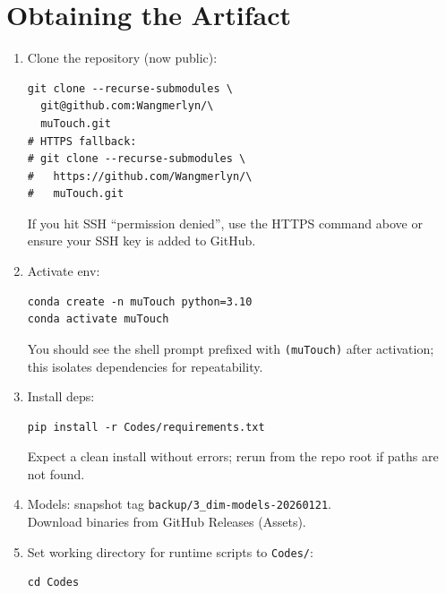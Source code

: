 \documentclass[conference]{IEEEtran}
\begin{document}
\section{Obtaining the Artifact}
\begin{enumerate}
  \item Clone the repository (now public):\\
  \begin{verbatim}
git clone --recurse-submodules \
  git@github.com:Wangmerlyn/\
  muTouch.git
# HTTPS fallback:
# git clone --recurse-submodules \
#   https://github.com/Wangmerlyn/\
#   muTouch.git
  \end{verbatim}
  If you hit SSH ``permission denied'', use the HTTPS command above or ensure your SSH key is added to GitHub.
\item Activate env:\\
  \begin{verbatim}
conda create -n muTouch python=3.10
conda activate muTouch
  \end{verbatim}
  You should see the shell prompt prefixed with \texttt{(muTouch)} after activation; this isolates dependencies for repeatability.
\item Install deps:\\
  \begin{verbatim}
pip install -r Codes/requirements.txt
  \end{verbatim}
  Expect a clean install without errors; rerun from the repo root if paths are not found.
\item Models: snapshot tag \texttt{backup/3\_dim-models-20260121}.\\ Download binaries from GitHub Releases (Assets).
\item Set working directory for runtime scripts to \texttt{Codes/}:\\
  \begin{verbatim}
cd Codes
  \end{verbatim}
\end{enumerate}
\end{document}
